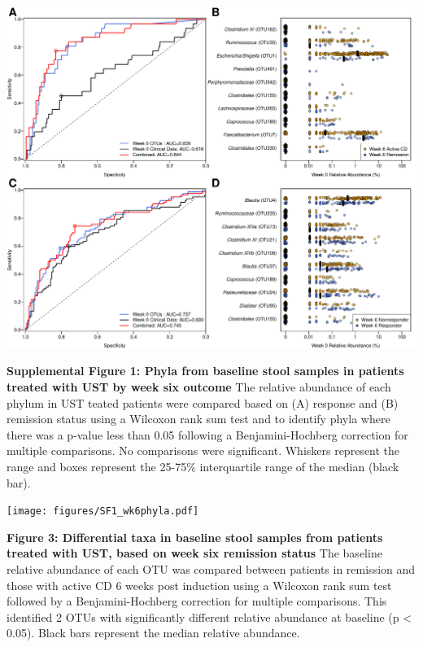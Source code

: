 \documentclass[12pt,]{article}
\begin{document}
\includegraphics{figures/Figure2_wk0Xwk6pred.pdf}

\newpage

\textbf{Supplemental Figure 1: Phyla from baseline stool samples in
patients treated with UST by week six outcome} The relative abundance of
each phylum in UST teated patients were compared based on (A) response
and (B) remission status using a Wilcoxon rank sum test and to identify
phyla where there was a p-value less than 0.05 following a
Benjamini-Hochberg correction for multiple comparisons. No comparisons
were significant. Whiskers represent the range and boxes represent the
25-75\% interquartile range of the median (black bar).

\texttt{[image: figures/SF1\_wk6phyla.pdf]}

\newpage

\textbf{Figure 3: Differential taxa in baseline stool samples from
patients treated with UST, based on week six remission status} The
baseline relative abundance of each OTU was compared between patients in
remission and those with active CD 6 weeks post induction using a
Wilcoxon rank sum test followed by a Benjamini-Hochberg correction for
multiple comparisons. This identified 2 OTUs with significantly
different relative abundance at baseline (p \textless{} 0.05). Black
bars represent the median relative abundance.
\end{document}
